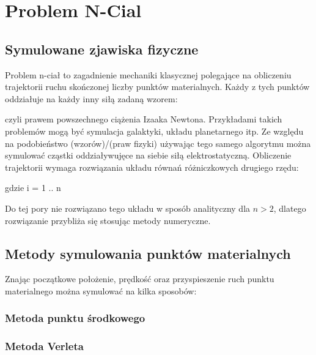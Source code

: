 
\section { Problem N-Cial }
\subsection {Symulowane zjawiska fizyczne}
Problem n-ciał to zagadnienie mechaniki klasycznej polegające na obliczeniu trajektorii ruchu skończonej liczby punktów materialnych. 
Każdy z tych punktów oddziałuje na każdy inny siłą zadaną wzorem:

\begin{center}
 
\end{center}

czyli prawem powszechnego ciążenia Izaaka Newtona.\linebreak
Przykładami takich problemów mogą być symulacja galaktyki, układu planetarnego itp.
Ze względu na podobieństwo (wzorów)/(praw fizyki) używając tego samego algorytmu można symulować cząstki oddziaływujęce na siebie siłą elektrostatyczną.\linebreak
Obliczenie trajektorii wymaga rozwiązania układu równań różniczkowych drugiego rzędu:
\begin{center}
 gdzie i = 1 .. n 
\end{center}


Do tej pory nie rozwiązano tego układu w sposób analityczny dla $n > 2$, dlatego rozwiązanie przybliża się stosując metody numeryczne.

\subsection {Metody symulowania punktów materialnych}

Znając początkowe położenie, prędkość oraz przyspieszenie ruch punktu materialnego można symulować na kilka sposobów:


\subsubsection {Metoda punktu środkowego}


\subsubsection {Metoda Verleta}

